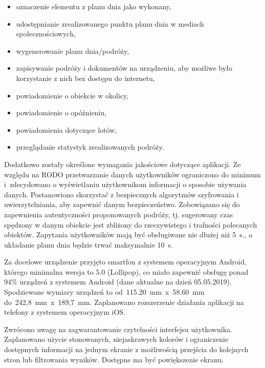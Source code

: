 \documentclass[10pt,twoside,a4paper]{report}
\begin{document}
\begin{itemize}
\item oznaczenie elementu z planu dnia jako wykonany,
\item udostępnianie zrealizowanego punktu planu dnia w mediach społecznościowych,
\item wygenerowanie planu dnia/podróży,
\item zapisywanie podróży i dokumentów na urządzeniu, aby możliwe było korzystanie z nich bez dostępu do internetu,
\item powiadomienie o obiekcie w okolicy,
\item powiadomienie o opóźnieniu,
\item powiadomienia dotyczące lotów,
\item przeglądanie statystyk zrealizowanych podróży.
\end{itemize}

\par Dodatkowo zostały określone wymagania jakościowe dotyczące aplikacji. Ze względu na RODO przetwarzanie danych użytkowników ograniczono do minimum i~zdecydowano o wyświetlaniu użytkownikom informacji o sposobie używania danych. Postanowiono skorzystać z bezpiecznych algorytmów szyfrowania i uwierzytelniania, aby zapewnić danym bezpieczeństwo. 
Zobowiązano się do zapewnienia autentyczności proponowanych podróży, tj. sugerowany czas spędzony w danym obiekcie jest zbliżony do rzeczywistego i trafności polecanych obiektów. Zapytania użytkowników mają być obsługiwane nie dłużej niż 5~s., a układanie planu dnia będzie trwać maksymalnie 10~s.

\par Za docelowe urządzenie przyjęto smartfon z systemem operacyjnym Android, którego minimalna wersja to 5.0 (Lollipop), co miało zapewnić obsługę ponad 94\% urządzeń z systemem Android (dane aktualne na dzień 05.05.2019\cite{Android usage}). Spodziewane wymiary urządzeń to od~115.20~mm~x~58.60~mm do~242,8~mm~x~189,7~mm. Zaplanowano rozszerzenie działania aplikacji na telefony z systemem operacyjnym iOS.

\par Zwrócono uwagę na zagwarantowanie czytelności interfejsu użytkownika. Zaplanowano użycie stonowanych, niejaskrawych kolorów i ograniczenie dostępnych informacji na jednym ekranie z możliwością przejścia do kolejnych stron lub filtrowania wyników. Dostępne ma być powiększenie ekranu.
\end{document}
